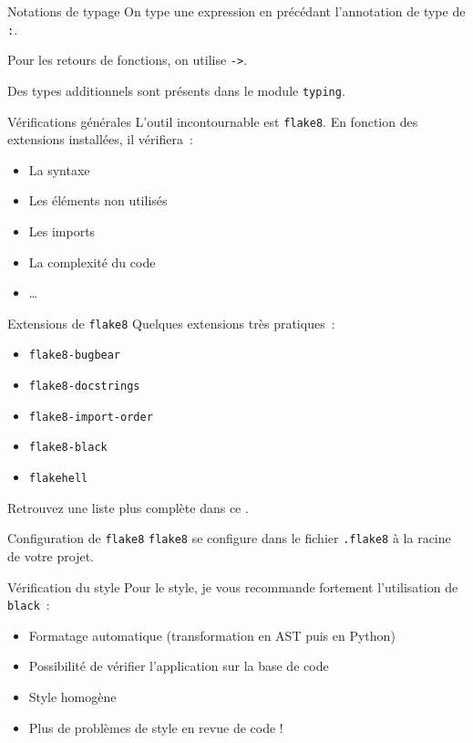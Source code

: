 \begin{frame}{Notations de typage}
  On type une expression en précédant l'annotation de type de \texttt{:}.

  Pour les retours de fonctions, on utilise \texttt{->}.


  Des types additionnels sont présents dans le module \texttt{typing}.
\end{frame}

\begin{frame}{Vérifications générales}
  L'outil incontournable est \texttt{flake8}. En fonction des extensions installées, il vérifiera~:

  \begin{itemize}[<+->]
    \item La syntaxe
    \item Les éléments non utilisés
    \item Les imports
    \item La complexité du code
    \item …
  \end{itemize}
\end{frame}

\begin{frame}{Extensions de \texttt{flake8}}
  Quelques extensions très pratiques~:

  \begin{itemize}
    \item \texttt{flake8-bugbear}
    \item \texttt{flake8-docstrings}
    \item \texttt{flake8-import-order}
    \item \texttt{flake8-black}
    \item \texttt{flakehell}
  \end{itemize}

  Retrouvez une liste plus complète dans ce .
\end{frame}

\begin{frame}{Configuration de \texttt{flake8}}
  \texttt{flake8} se configure dans le fichier \texttt{.flake8} à la racine de votre projet.

\end{frame}

\begin{frame}{Vérification du style}
  Pour le style, je vous recommande fortement l'utilisation de \texttt{black}~:

  \begin{itemize}[<+->]
    \item Formatage automatique (transformation en AST puis en Python)
    \item Possibilité de vérifier l'application sur la base de code
    \item Style homogène
    \item Plus de problèmes de style en revue de code !
  \end{itemize}
\end{frame}

